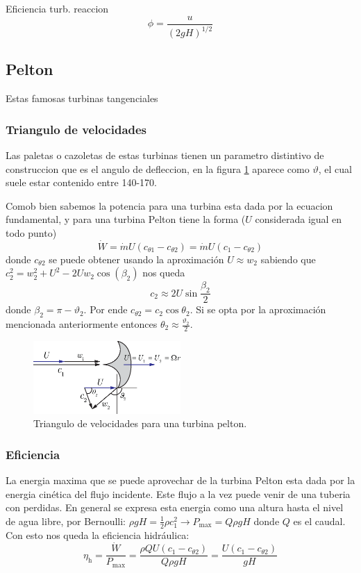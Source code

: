 \documentclass{article}
\newcommand{\substy}[2]{\ensuremath{{#1_{\mathrm{#2}}}}}
\newcommand{\ctan}[1]{\ensuremath{c_{\theta #1}}}
\newcommand{\etahid}{\substy{\eta}{h}}
\newcommand{\deflectionangle}{{\vartheta}}
\begin{document}
Eficiencia turb. reaccion 
\[
\phi=\frac{u}{(2 g H)^{1 / 2}}
\]
\subsection{Pelton}
Estas famosas turbinas tangenciales 

\subsubsection{Triangulo de velocidades}
Las paletas o cazoletas de estas turbinas tienen un parametro distintivo de construccion que es el angulo de defleccion, en la figura \ref{fig:peltontriangle} aparece como $\deflectionangle$, el cual suele estar contenido entre 140-170. 

Comob bien sabemos la potencia para una turbina esta dada por la ecuacion fundamental, y para una turbina Pelton tiene la forma ($U$ considerada igual en todo punto)
\[
\dot{W} = \dot{m} U (\ctan{1}-\ctan{2})=\dot{m} U (c_{1}-\ctan{2})
\]
donde $\ctan{2}$ se puede obtener usando la aproximación $U\approx w_2$ sabiendo que $c_2^2=w_2^2+U^2-2Uw_2\cos (\beta_2)$ nos queda
\[
c_2 \approx 2U\sin \frac{\beta_2}{2} 
\]
donde $\beta_2 = \pi - \vartheta_2 $. Por ende $\ctan{2} = c_2 \cos \theta_2$. Si se opta por la aproximación mencionada anteriormente entonces $\theta_2 \approx \frac{\vartheta_2}{2}$.

\begin{figure}[htb!]
    \centering
    \includegraphics[width=0.5\textwidth]{fig/pelton_triangle.eps}
    \caption{Triangulo de velocidades para una turbina pelton.}
    \label{fig:peltontriangle}
\end{figure}

\subsubsection{Eficiencia}
La energia maxima que se puede aprovechar de la turbina Pelton esta dada por la energia cinética del flujo incidente. Este flujo a la vez puede venir de una tuberia con perdidas. En general se expresa esta energia como una altura hasta el nivel de agua libre, por Bernoulli: $\rho g H = \frac{1}{2} \rho c_1^2 \longrightarrow P_{\max} = Q\rho gH$ donde $Q$ es el caudal. Con esto nos queda la eficiencia hidráulica:
\[
 \etahid = \frac{\dot{W}}{P_{\max}} = \frac{\rho Q U(c_1-\ctan{2})}{Q\rho gH} = \frac{U(c_1-\ctan{2})}{gH}
\]
\end{document}
